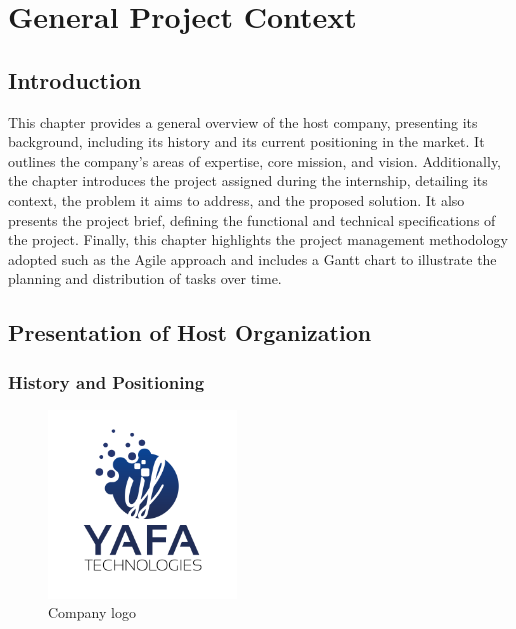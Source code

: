 \chapter{General Project Context}
\label{chap: General Project Context}

\section*{Introduction}

This chapter provides a general overview of the host company, presenting its background, including its history and its current positioning in the market. It outlines the company’s areas of expertise, core mission, and vision. Additionally, the chapter introduces the project assigned during the internship, detailing its context, the problem it aims to address, and the proposed solution. It also presents the project brief, defining the functional and technical specifications of the project. Finally, this chapter highlights the project management methodology adopted  such as the Agile approach  and includes a Gantt chart to illustrate the planning and distribution of tasks over time.

\newpage

{}
\section{Presentation of Host Organization}

 \subsection{History and Positioning}
 \begin{figure}[H] 
    \centering
    \includegraphics[width=5cm]{Logos/Company_Logo.png}
    \caption{Company logo}
\end{figure}

